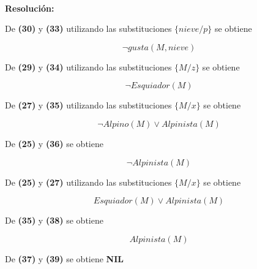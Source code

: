 \documentclass[12pt]{article} %
\begin{document}
\par \ \\
\par \textbf{Resolución:}\\

\par De \textbf{(30)} y \textbf{(33)} utilizando las substituciones $\{nieve/p\}$ se obtiene

\begin{equation}
\neg gusta(M, nieve)
\end{equation}

\par De \textbf{(29)} y \textbf{(34)} utilizando las substituciones $\{M/z\}$ se obtiene

\begin{equation}
\neg Esquiador(M)
\end{equation}

\par De \textbf{(27)} y \textbf{(35)} utilizando las substituciones $\{M/x\}$ se obtiene

\begin{equation}
\neg Alpino(M) \vee Alpinista(M)
\end{equation}

\par De \textbf{(25)} y \textbf{(36)} se obtiene

\begin{equation}
\neg  Alpinista(M)
\end{equation}


\par De \textbf{(25)} y \textbf{(27)} utilizando las substituciones $\{M/x\}$ se obtiene

\begin{equation}
 Esquiador(M) \vee Alpinista(M)
\end{equation}

\par De \textbf{(35)} y \textbf{(38)} se obtiene

\begin{equation}
Alpinista(M)
\end{equation}

\par De \textbf{(37)} y \textbf{(39)} se obtiene \textbf{NIL}
\end{document}
